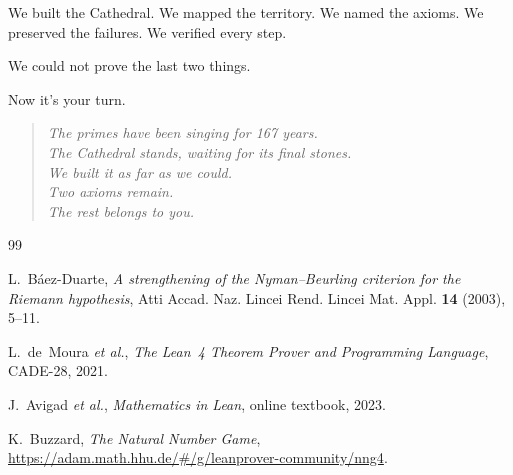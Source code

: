 \documentclass[11pt,a4paper]{article}
\begin{document}
We built the Cathedral. We mapped the territory. We named the
axioms. We preserved the failures. We verified every step.

We could not prove the last two things.

Now it's your turn.

\begin{quote}
\emph{The primes have been singing for 167 years.\\
The Cathedral stands, waiting for its final stones.\\
We built it as far as we could.\\
Two axioms remain.\\
The rest belongs to you.}
\end{quote}

\begin{thebibliography}{99}

L.~B\'aez-Duarte, \emph{A strengthening of the Nyman--Beurling
criterion for the Riemann hypothesis}, Atti Accad. Naz. Lincei
Rend. Lincei Mat. Appl. \textbf{14} (2003), 5--11.

L.~de~Moura \emph{et al.}, \emph{The Lean~4 Theorem Prover and
Programming Language}, CADE-28, 2021.

J.~Avigad \emph{et al.}, \emph{Mathematics in Lean}, online
textbook, 2023.

K.~Buzzard, \emph{The Natural Number Game},
\url{https://adam.math.hhu.de/\#/g/leanprover-community/nng4}.

\end{thebibliography}
\end{document}
